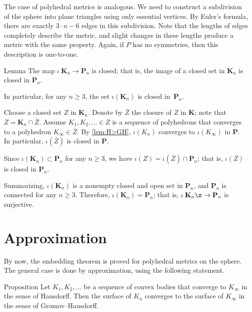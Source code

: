 The case of polyhedral metrics is analogous.
We need to construct a subdivision of the sphere into plane triangles using only essential vertices.
By Euler's formula, there are exactly $3\cdot n-6$ edges in this subdivision.
Note that the lengths of edges completely describe the metric, and slight changes in these lengths produce a metric with the same property.
Again, if $P$ has no symmetries, then this description is one-to-one.

\begin{thm}{Lemma}
The map $\iota\:\mathbf{K}_n\to\mathbf{P}_n$ is closed;
that is, the image of a closed set in $\mathbf{K}_n$ is closed in $\mathbf{P}_n$.

In particular, for any $n\ge 3$, the set $\iota(\mathbf{K}_n)$ is closed in~$\mathbf{P}_n$.
\end{thm}

Choose a closed set $Z$ in $\mathbf{K}_n$.
Denote by $\bar Z$ the closure of $Z$ in $\mathbf{K}$; note that $Z=\mathbf{K}_n\cap \bar Z$.
Assume $K_1,K_2,\dots\in Z$ is a sequence of polyhedrons that converges to a polyhedron $K_\infty\in\bar Z$.
By \ref{lem:H>GH}, $\iota(K_n)$ converges to $\iota(K_\infty)$ in $\mathbf{P}$.
In particular, $\iota(\bar Z)$ is closed in $\mathbf{P}$.

Since $\iota(\mathbf{K}_n)\subset \mathbf{P}_n$ for any $n\ge 3$, we have $\iota (Z)=\iota(\bar Z)\cap \mathbf{P}_n$;
that is, $\iota (Z)$ is closed in $\mathbf{P}_n$.

\medskip

Summarizing, $\iota(\mathbf{K}_n)$ is a nonempty closed and open set in $\mathbf{P}_n$, and $\mathbf{P}_n$ is connected for any $n\ge 3$.
Therefore, $\iota(\mathbf{K}_n)=\mathbf{P}_n$; that is, $\iota\:\mathbf{K}_n\z\to\mathbf{P}_n$ is surjective.
\qeds

\section{Approximation}

By now, the embedding theorem is proved for polyhedral metrics on the sphere.
The general case is done by approximation, using the following statement.

\begin{thm}{Proposition}\label{prop:H>GH}
Let $K_1,K_2,\dots$ be a sequence of convex bodies that converge to $K_\infty$ in the sense of Hausdorff.
Then the surface of $K_n$ converges to the surface of $K_\infty$ in the sense of Gromov--Hausdorff.
\end{thm}

